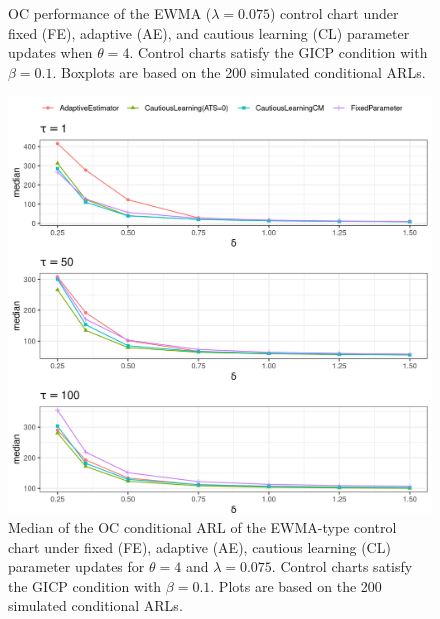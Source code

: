 \begin{figure}
\begin{subfigure}{0.49\textwidth}
\end{subfigure}
  \caption{OC performance of the EWMA ($ \lambda = 0.075$) control chart under fixed (FE), adaptive (AE), and cautious learning (CL) parameter updates when $ \theta = 4$.
    Control charts satisfy the GICP condition  with $ \beta = 0.1$.
  Boxplots are based on the 200 simulated conditional ARLs.}
  \label{fig:lambda=0.075/EWMA OC theta=4}
\end{figure}

\begin{figure}
  \includegraphics[width=\textwidth]{img/sims/theta=4.0_signedEWMA(l = 0.075, upw = true, L = 1.0)/OC-profiles.png}
  \caption{Median of the OC conditional ARL of the EWMA-type control chart under fixed (FE), adaptive (AE), cautious learning (CL) parameter updates for $ \theta = 4$ and $ \lambda = 0.075$.
    Control charts satisfy the GICP condition  with $ \beta = 0.1$.
  Plots are based on the 200 simulated conditional ARLs.}
  \label{fig:lambda=0.05/EWMA OC profiles}
\end{figure}


